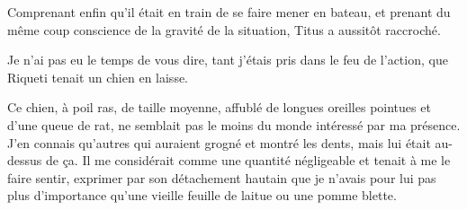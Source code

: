 Comprenant enfin qu’il était en train de se faire mener en bateau, et prenant du même coup conscience de la gravité de la situation, Titus a aussitôt raccroché.

Je n’ai pas eu le temps de vous dire, tant j’étais pris dans le feu de l’action, que Riqueti tenait un chien en laisse.

\illusloflabel{}%

Ce chien, à poil ras, de taille moyenne, affublé de longues oreilles pointues et d’une queue de rat, ne semblait pas le moins du monde intéressé par ma présence. J’en connais qu’autres qui auraient grogné et montré les dents, mais lui était au-dessus de ça. Il me considérait comme une quantité négligeable et tenait à me le faire sentir, exprimer par son détachement hautain que je n’avais pour lui pas plus d’importance qu’une vieille feuille de laitue ou une pomme blette.

